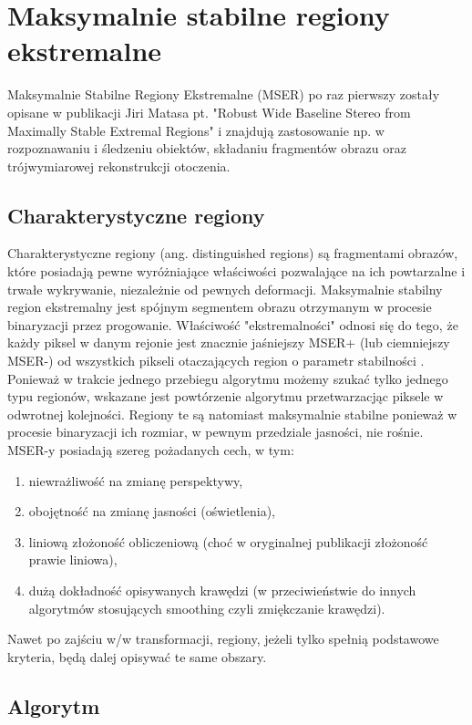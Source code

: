 \chapter{Maksymalnie stabilne regiony ekstremalne}

Maksymalnie Stabilne Regiony Ekstremalne (MSER) po raz pierwszy zostały opisane
w publikacji Jiri Matasa pt. "Robust Wide Baseline Stereo from Maximally Stable
Extremal Regions" \cite{matas02} i znajdują zastosowanie np. w rozpoznawaniu i śledzeniu
obiektów, składaniu fragmentów obrazu oraz trójwymiarowej rekonstrukcji
otoczenia.

\section{Charakterystyczne regiony}

Charakterystyczne regiony (ang. distinguished regions) są fragmentami obrazów,
które posiadają pewne wyróżniające właściwości pozwalające na ich powtarzalne i
trwałe wykrywanie, niezależnie od pewnych deformacji. Maksymalnie stabilny
region ekstremalny jest spójnym segmentem obrazu otrzymanym w procesie
binaryzacji przez progowanie. Właściwość "ekstremalności" odnosi się do tego,
że każdy piksel w danym rejonie jest znacznie jaśniejszy MSER+ (lub ciemniejszy
MSER-) od wszystkich pikseli otaczających region o parametr stabilności
. Ponieważ w trakcie jednego przebiegu algorytmu możemy szukać
tylko jednego typu regionów, wskazane jest powtórzenie algorytmu przetwarzacjąc 
piksele w odwrotnej kolejności. Regiony te są natomiast maksymalnie stabilne
ponieważ w procesie binaryzacji ich rozmiar, w pewnym przedziale jasności, nie
rośnie. MSER-y posiadają szereg pożadanych cech, w tym: 
\begin{enumerate} \item niewrażliwość na zmianę perspektywy, \item obojętność
    na zmianę jasności (oświetlenia), \item liniową złożoność obliczeniową
    (choć w oryginalnej publikacji złożoność prawie liniowa), \item dużą
    dokładność opisywanych krawędzi (w przeciwieństwie do innych algorytmów
    stosujących smoothing czyli zmiękczanie krawędzi).  
\end{enumerate}

Nawet po zajściu w/w transformacji, regiony, jeżeli tylko
spełnią podstawowe kryteria, będą dalej opisywać te same obszary.

\section{Algorytm}

